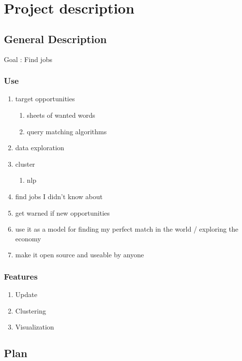 \documentclass[11pt]{article}
\author{teddd}
\date{\today}
\title{}
\begin{document}
\tableofcontents

\section{Project description}
\label{sec:orgb7ce67a}
\subsection{General Description}
\label{sec:org01a6482}
Goal : Find jobs
\subsubsection{Use}
\label{sec:org54efe86}
\begin{enumerate}
\item target opportunities
\label{sec:orgbe3bb54}
\begin{enumerate}
\item sheets of wanted words
\label{sec:org0e04383}
\item query matching algorithms
\label{sec:org8d898f5}
\end{enumerate}
\item data exploration
\label{sec:org0d9debe}
\item cluster
\label{sec:org30d7d2a}
\begin{enumerate}
\item nlp
\label{sec:org5cba169}
\end{enumerate}
\item find jobs I didn't know about
\label{sec:org2cd533c}
\item get warned if new opportunities
\label{sec:org2e2ace3}
\item use it as a model for finding my perfect match in the world / exploring the economy
\label{sec:orgc649cbb}
\item make it open source and useable by anyone
\label{sec:org6c82733}
\end{enumerate}
\subsubsection{Features}
\label{sec:orge75ba2c}
\begin{enumerate}
\item Update
\label{sec:org621de1c}
\item Clustering
\label{sec:org368aef6}
\item Visualization
\label{sec:org6cd2c05}
\end{enumerate}
\subsection{Plan}
\label{sec:orgb8cf36b}
\end{document}
